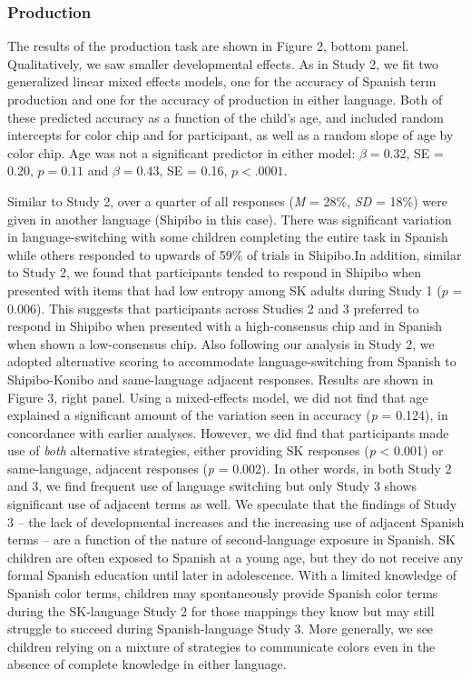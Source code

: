 \documentclass[
  english,
  ,man,floatsintext]{apa6}
\begin{document}
\hypertarget{production-1}{%
\subsubsection{Production}\label{production-1}}

The results of the production task are shown in Figure 2, bottom panel. Qualitatively, we saw smaller developmental effects. As in Study 2, we fit two generalized linear mixed effects models, one for the accuracy of Spanish term production and one for the accuracy of production in either language. Both of these predicted accuracy as a function of the child's age, and included random intercepts for color chip and for participant, as well as a random slope of age by color chip. Age was not a significant predictor in either model: \(\beta = 0.32\), SE = 0.20, \(p = 0.11\) and \(\beta = 0.43\), SE = 0.16, \(p < .0001\).

Similar to Study 2, over a quarter of all responses (\emph{M} = 28\%, \emph{SD} = 18\%) were given in another language (Shipibo in this case). There was significant variation in language-switching with some children completing the entire task in Spanish while others responded to upwards of 59\% of trials in Shipibo.In addition, similar to Study 2, we found that participants tended to respond in Shipibo when presented with items that had low entropy among SK adults during Study 1 (\(p\) = 0.006). This suggests that participants across Studies 2 and 3 preferred to respond in Shipibo when presented with a high-consensus chip and in Spanish when shown a low-consensus chip.
Also following our analysis in Study 2, we adopted alternative scoring to accommodate language-switching from Spanish to Shipibo-Konibo and same-language adjacent responses. Results are shown in Figure 3, right panel. Using a mixed-effects model, we did not find that age explained a significant amount of the variation seen in accuracy (\emph{p} = 0.124), in concordance with earlier analyses. However, we did find that participants made use of \emph{both} alternative strategies, either providing SK responses (\emph{p} \textless{} 0.001) or same-language, adjacent responses (\emph{p} = 0.002). In other words, in both Study 2 and 3, we find frequent use of language switching but only Study 3 shows significant use of adjacent terms as well.
We speculate that the findings of Study 3 -- the lack of developmental increases and the increasing use of adjacent Spanish terms -- are a function of the nature of second-language exposure in Spanish. SK children are often exposed to Spanish at a young age, but they do not receive any formal Spanish education until later in adolescence. With a limited knowledge of Spanish color terms, children may spontaneously provide Spanish color terms during the SK-language Study 2 for those mappings they know but may still struggle to succeed during Spanish-language Study 3. More generally, we see children relying on a mixture of strategies to communicate colors even in the absence of complete knowledge in either language.
\end{document}
